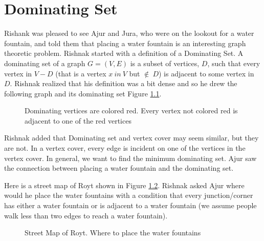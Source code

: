 \chapter{Dominating Set}

Rishank was pleased to see Ajur and Jura, who were on the lookout for a water fountain, and told them that placing a water fountain is an interesting graph theoretic problem. Rishnak started with a definition of a Dominating Set. A dominating set of a graph $G=(V,E)$ is a subset of vertices, $D$, such that every vertex in $V-D$ (that is a vertex $x~in ~V $ but $\notin~ D$) is adjacent to some vertex in $D$. Rishnak realized that his definition was a bit dense and so he drew the 
 following graph and its dominating set Figure \ref{18g1}.
\begin{figure}
\begin{center}
\caption{ Dominating vertices are colored red. Every vertex not colored red is adjacent to one of the red vertices}\label{18g1}
\end{center}
\end{figure}

Rishnak added that Dominating set and vertex cover may seem similar, but they are not. In a vertex cover, every edge is incident on one of the vertices in the vertex cover. In general, we want to find the minimum dominating set. Ajur saw the connection between placing a water fountain and the dominating set.

Here is a street map of Royt shown in Figure \ref{18g2}. Rishnak asked Ajur where would he place the water fountains with a condition that every junction/corner has either a water fountain or is adjacent to a water fountain (we assume people walk less than two edges to reach a water fountain).
\begin{figure}
\begin{center}

\caption{Street Map of Royt. Where to place the water fountains}\label{18g2}
\end{center}
\end{figure}


